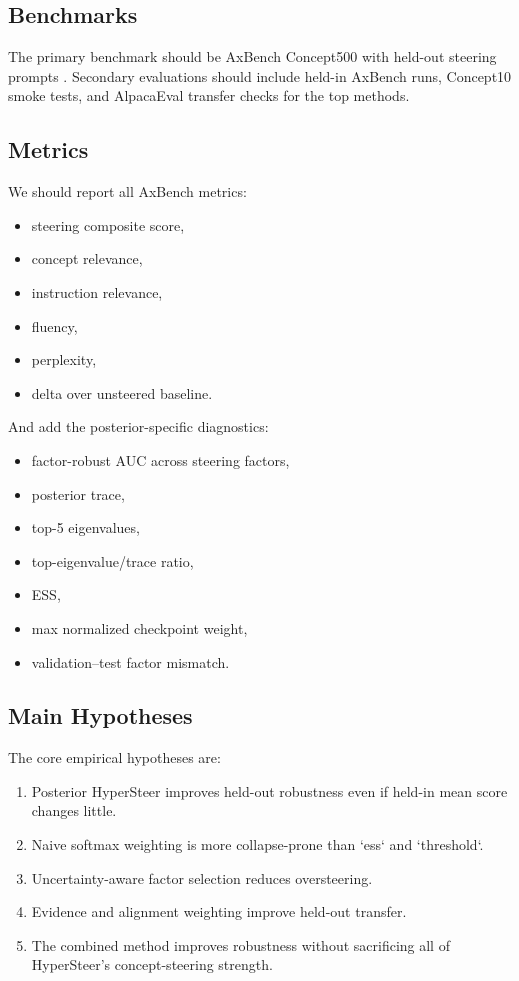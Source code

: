 \documentclass[10pt]{article}
\begin{document}
\subsection{Benchmarks}

The primary benchmark should be AxBench Concept500 with held-out steering prompts \citep{wu2025axbench,sun2025hypersteer}. Secondary evaluations should include held-in AxBench runs, Concept10 smoke tests, and AlpacaEval transfer checks for the top methods.

\subsection{Metrics}

We should report all AxBench metrics:
\begin{itemize}[leftmargin=1.5em]
  \item steering composite score,
  \item concept relevance,
  \item instruction relevance,
  \item fluency,
  \item perplexity,
  \item delta over unsteered baseline.
\end{itemize}
And add the posterior-specific diagnostics:
\begin{itemize}[leftmargin=1.5em]
  \item factor-robust AUC across steering factors,
  \item posterior trace,
  \item top-5 eigenvalues,
  \item top-eigenvalue/trace ratio,
  \item ESS,
  \item max normalized checkpoint weight,
  \item validation--test factor mismatch.
\end{itemize}

\subsection{Main Hypotheses}

The core empirical hypotheses are:
\begin{enumerate}[leftmargin=1.5em]
  \item Posterior HyperSteer improves held-out robustness even if held-in mean score changes little.
  \item Naive softmax weighting is more collapse-prone than `ess` and `threshold`.
  \item Uncertainty-aware factor selection reduces oversteering.
  \item Evidence and alignment weighting improve held-out transfer.
  \item The combined method improves robustness without sacrificing all of HyperSteer’s concept-steering strength.
\end{enumerate}
\end{document}
